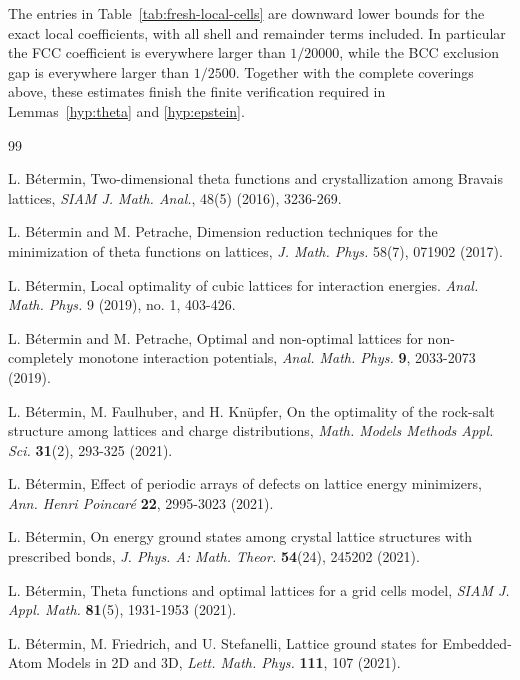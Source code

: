 \documentclass[reqno,english]{amsart}
\theoremstyle{definition}
\newtheorem{open problem}[theorem]{Open Problem}
\theoremstyle{remark}
\theoremstyle{plain}
\numberwithin{equation}{section}
\begin{document}
The entries in Table~\ref{tab:fresh-local-cells} are downward lower bounds
for the exact local coefficients, with all shell and remainder terms
included. In particular the FCC coefficient is everywhere larger than
$1/20000$, while the BCC exclusion gap is everywhere larger than
$1/2500$. Together with the complete coverings above, these estimates
finish the finite verification required in Lemmas~\ref{hyp:theta} and
\ref{hyp:epstein}.

\begin{thebibliography}{99}

 L. B\'etermin,
Two-dimensional theta functions and crystallization among Bravais lattices, {\em SIAM J. Math. Anal.},
 48(5) (2016), 3236-269.

L. B\'{e}termin and M. Petrache,
Dimension reduction techniques for the minimization of theta functions on lattices,
\textit{J. Math. Phys.} {58}(7), 071902 (2017).

L. B\'etermin, Local optimality of cubic lattices for interaction energies. {\em Anal. Math. Phys.} 9 (2019), no. 1, 403-426.

L. B\'{e}termin and M. Petrache,
Optimal and non-optimal lattices for non-completely monotone interaction potentials,
\textit{Anal. Math. Phys.} \textbf{9}, 2033-2073 (2019).


L. B\'{e}termin, M. Faulhuber, and H. Kn\"{u}pfer,
On the optimality of the rock-salt structure among lattices and charge distributions,
\textit{Math. Models Methods Appl. Sci.} \textbf{31}(2), 293-325 (2021).


L. B\'{e}termin,
Effect of periodic arrays of defects on lattice energy minimizers,
\textit{Ann. Henri Poincar\'{e}} \textbf{22}, 2995-3023 (2021).


L. B\'{e}termin,
On energy ground states among crystal lattice structures with prescribed bonds,
\textit{J. Phys. A: Math. Theor.} \textbf{54}(24), 245202 (2021).


L. B\'{e}termin,
Theta functions and optimal lattices for a grid cells model,
\textit{SIAM J. Appl. Math.} \textbf{81}(5), 1931-1953 (2021).

L. B\'{e}termin, M. Friedrich, and U. Stefanelli,
Lattice ground states for Embedded-Atom Models in 2D and 3D,
\textit{Lett. Math. Phys.} \textbf{111}, 107 (2021).



\end{thebibliography}
\end{document}
